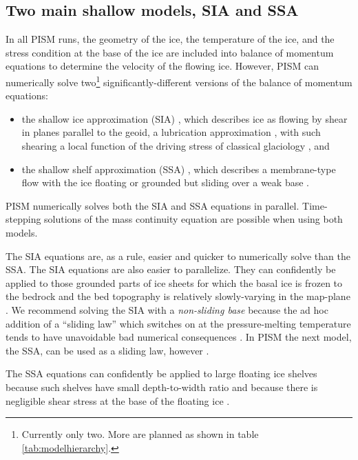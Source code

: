 \documentclass[11pt,final]{amsart}
\begin{document}
\subsection{Two main shallow models, SIA and SSA}  In all PISM runs, the geometry of the ice, the temperature of the ice, and the stress condition at the base of the ice are included into balance of momentum equations to determine the velocity of the flowing ice.   However, PISM can numerically solve two\footnote{Currently only two.  More are planned as shown in table \ref{tab:modelhierarchy}.} significantly-different versions of the balance of momentum equations:\begin{itemize}
\item the shallow ice approximation (SIA) \cite{Hutter}, which describes ice as flowing by shear in planes parallel to the geoid, a lubrication approximation \cite{Fowler}, with such shearing a local function of the driving stress of classical glaciology \cite{Paterson}, and
\item the shallow shelf approximation (SSA) \cite{WeisGreveHutter}, which describes a membrane-type flow with the ice floating or grounded but sliding over a weak base \cite{Morland,MacAyeal,SchoofStream}.
\end{itemize}
PISM numerically solves both the SIA and SSA equations in parallel.  Time-stepping solutions of the mass continuity equation are possible when using both models.

The SIA equations are, as a rule, easier and quicker to numerically solve than the SSA.  The SIA equations are also easier to parallelize.  They can confidently be applied to those grounded parts of ice sheets for which the basal ice is frozen to the bedrock and the bed topography is relatively slowly-varying in the map-plane \cite{Fowler}.  We recommend solving the SIA with a \emph{non-sliding base} because the ad hoc addition of a ``sliding law'' which switches on at the pressure-melting temperature tends to have unavoidable bad numerical consequences \cite[appendix B]{BBssasliding}.  In PISM the next model, the SSA, can be used as a sliding law, however \cite{BBssasliding}.

The SSA equations can confidently be applied to large floating ice shelves because such shelves have small depth-to-width ratio and because there is negligible shear stress at the base of the floating ice \cite{Morland,MorlandZainuddin}.
\end{document}
